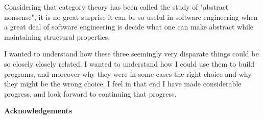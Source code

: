 \documentclass[a4paper,10pt]{article}
\theoremstyle{definition}
\begin{document}
Considering that category theory has been called the study
of "abstract nonsense"\cite{mac1997pnas},
it is no great surprise it can be so useful in software engineering
when a great deal of software engineering is decide what one
can make abstract while maintaining structural properties.

I wanted to understand how these three seemingly very disparate
things could be so closely closely related.
I wanted to understand how I could use them to build programs,
and moreover why they were in some cases the right choice and why
they might be the wrong choice.
I feel in that end I have made considerable progress,
and look forward to continuing that progress.

\textbf{Acknowledgements}

\pagebreak
\appendix



\pagebreak


\end{document}

